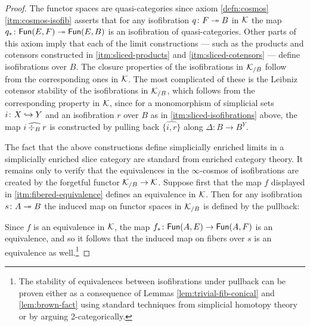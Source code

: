 \begin{proof}
The functor spaces are quasi-categories since axiom \ref{defn:cosmos}\ref{itm:cosmos-isofib} asserts that for any isofibration $q \colon F \twoheadrightarrow B$ in ${\mathord{\mathcal{K}}}$ the map $q_* \colon {\mathord{\mathsf{Fun}}}(E,F) \twoheadrightarrow {\mathord{\mathsf{Fun}}}(E,B)$ is an isofibration of quasi-categories. Other parts of this axiom imply that each of the limit constructions --- such as the products and cotensors constructed in \ref{itm:sliced-products} and \ref{itm:sliced-cotensors} --- define isofibrations over $B$. The closure properties of the isofibrations in ${\mathord{\mathcal{K}}}_{/B}$ follow from the corresponding ones in ${\mathord{\mathcal{K}}}$. The most complicated of these is the Leibniz cotensor stability of the isofibrations in ${\mathord{\mathcal{K}}}_{/B}$, which follows from the corresponding property in ${\mathord{\mathcal{K}}}$, since for a monomorphism of simplicial sets $i \colon X\hookrightarrow Y$ and an isofibration $r$ over $B$ as in \ref{itm:sliced-isofibrations} above, the map $i \mathbin{\widehat{\div_B}} r$ is constructed by pulling back $\widehat{\{i , r\}}$ along $\Delta \colon B \to B^Y$.

The fact that the above constructions define simplicially enriched limits in a simplicially enriched slice category are standard from enriched category theory. It remains only to verify that the equivalences in the $\infty$-cosmos of isofibrations are created by the forgetful functor ${\mathord{\mathcal{K}}}_{/B} \to {\mathord{\mathcal{K}}}$. Suppose first that the map $f$ displayed in \ref{itm:fibered-equivalence} defines an equivalence in ${\mathord{\mathcal{K}}}$. Then for any isofibration $s \colon A \twoheadrightarrow B$ the induced map on functor spaces in ${\mathord{\mathcal{K}}}_{/B}$ is defined by the pullback:
\begin{center}
\end{center}
Since $f$ is an equivalence in ${\mathord{\mathcal{K}}}$, the map $f_* \colon {\mathord{\mathsf{Fun}}}(A,E) \to {\mathord{\mathsf{Fun}}}(A,F)$ is an equivalence, and so it follows that the induced map on fibers over $s$ is an equivalence as well.\footnote{The stability of equivalences between isofibrations under pullback can be proven either as a consequence of Lemmas \ref{lem:trivial-fib-conical} and \ref{lem:brown-fact} using standard techniques from simplicial homotopy theory %
 or by arguing 2-categorically.} %


\end{proof}
